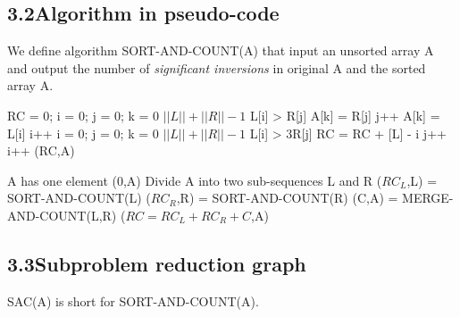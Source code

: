 \documentclass[a4paper,12pt]{article}
\begin{document}
\subsection*{\textnormal{3.2\quad Algorithm in pseudo-code}}

We define algorithm SORT-AND-COUNT(A) that input an unsorted array A and output the number of \textit{significant inversions} in original A and the sorted array A.

\begin{codebox}
\li RC = 0; i = 0; j = 0;
\li \For k = 0 \To $||L||+||R||-1$
    \Do
\li \If L[i] > R[j]
    \Then
\li A[k] = R[j]
\li j++
\li \Else
\li A[k] = L[i]
\li i++
	\End
	\End
\li i = 0; j = 0;
\li \For k = 0 \To $||L||+||R||-1$
    \Do
\li \If L[i] > 3R[j]
    \Then
\li RC = RC + [L] - i
\li j++
\li \Else
\li i++
	\End
    \End
\li \Return (RC,A)
\end{codebox}

\begin{codebox}
\li \If A has one element
    \Then
\li \Return (0,A)
\li \Else
\li Divide A into two sub-sequences L and R
\li ($RC_L$,L) = SORT-AND-COUNT(L)
\li ($RC_R$,R) = SORT-AND-COUNT(R)
\li (C,A) = MERGE-AND-COUNT(L,R)
\li \Return ($RC=RC_L+RC_R+C$,A)
\End
\end{codebox}

\subsection*{\textnormal{3.3\quad Subproblem reduction graph}}

SAC(A) is short for SORT-AND-COUNT(A).
\end{document}

